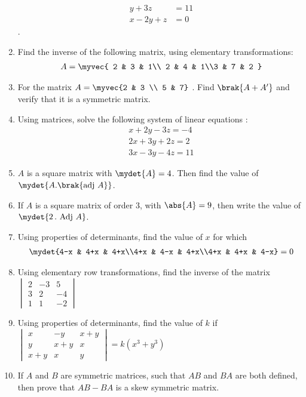 \begin{enumerate}
\begin{align*}
    y+3z&=11 \\
    x-2y+z&= 0
\end{align*}.
\item Find the inverse of the following matrix, using elementary transformations:
 \begin{align*}
 A=\myvec{ 2 & 3 & 1\\ 2 & 4 & 1\\3 & 7 & 2 }
 \end{align*}
 \item For the matrix $A = \myvec{2 & 3  \\ 5 & 7} $ . Find $\brak{A + A'}$ and verify that it is a symmetric matrix.
\item Using matrices, solve the following system of linear equations :
	\begin{align*}
		x+2y-3z=-4\\
		2x+3y+2z=2\\
		3x-3y-4z=11
	\end{align*}
 \item $ A $ is a square matrix with $\mydet{A} = 4 $. Then find the value of  $\mydet{ A .\brak{\text{adj }A}}$.
 \item If $A$ is a square matrix of order $3$, with $\abs{A}=9$, then write the value of $\mydet{2\,.\text{ Adj }A}$.
 \item Using properties of determinants, find the value of $x$ for which
	\begin{align*}
	\mydet{4-x & 4+x & 4+x\\4+x & 4-x & 4+x\\4+x & 4+x & 4-x}=0
        \end{align*}
\item Using elementary row transformations, find the inverse of the matrix 
$\begin{vmatrix}
    2 & -3 & 5\\
    3 & 2 & -4 \\
    1 & 1 & -2
\end{vmatrix}$
\item Using properties of determinants, find the value of $k$ if      $\begin{vmatrix}
x & -y & x+y\\
y & x+y & x\\
x+y & x & y                                                 \end{vmatrix}=k{(x^{3}+y^{3})}$
\item If $A$ and $B$ are symmetric matrices, such that $AB$ and $BA$ are both defined, then prove that $AB-BA$ is a skew symmetric matrix.



\end{enumerate}
